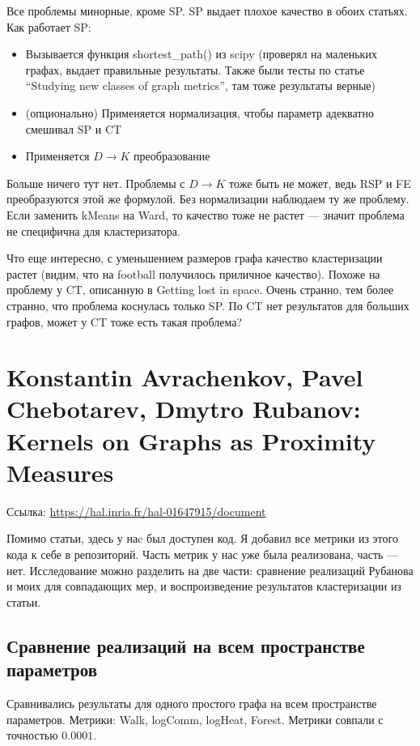 \documentclass{article}
\begin{document}
Все проблемы минорные, кроме SP. SP выдает плохое качество в обоих статьях.
Как работает SP:
\begin{itemize}
  \item Вызывается функция shortest\_path() из scipy (проверял на маленьких графах, выдает правильные результаты. Также были тесты по статье ``Studying new classes of graph metrics'', там тоже результаты верные)
  \item (опционально) Применяется нормализация, чтобы параметр адекватно смешивал SP и CT
  \item Применяется $D \rightarrow K$ преобразование
\end{itemize}

Больше ничего тут нет. Проблемы с $D \rightarrow K$ тоже быть не может, ведь RSP и FE преобразуются этой же формулой. Без нормализации наблюдаем ту же проблему. Если заменить kMeans на Ward, то качество тоже не растет --- значит проблема не специфична для кластеризатора.

Что еще интересно, с уменьшением размеров графа качество кластеризации растет (видим, что на football получилось приличное качество). Похоже на проблему у CT, описанную в Getting lost in space. Очень странно, тем более странно, что проблема коснулась только SP. По CT нет результатов для больших графов, может у CT тоже есть такая проблема?


\section{Konstantin Avrachenkov, Pavel Chebotarev, Dmytro Rubanov:\\
         Kernels on Graphs as Proximity Measures}
Ссылка: \url{https://hal.inria.fr/hal-01647915/document}

Помимо статьи, здесь у наc был доступен код. Я добавил все метрики из этого кода к себе в репозиторий. Часть метрик у нас уже была реализована, часть --- нет.
Исследование можно разделить на две части: сравнение реализаций Рубанова и моих для совпадающих мер, и воспроизведение результатов кластеризации из статьи.

\subsection{Сравнение реализаций на всем пространстве параметров}
Сравнивались результаты для одного простого графа на всем пространстве параметров. Метрики: Walk, logComm, logHeat, Forest. Метрики совпали с точностью  $0.0001$.
\end{document}
